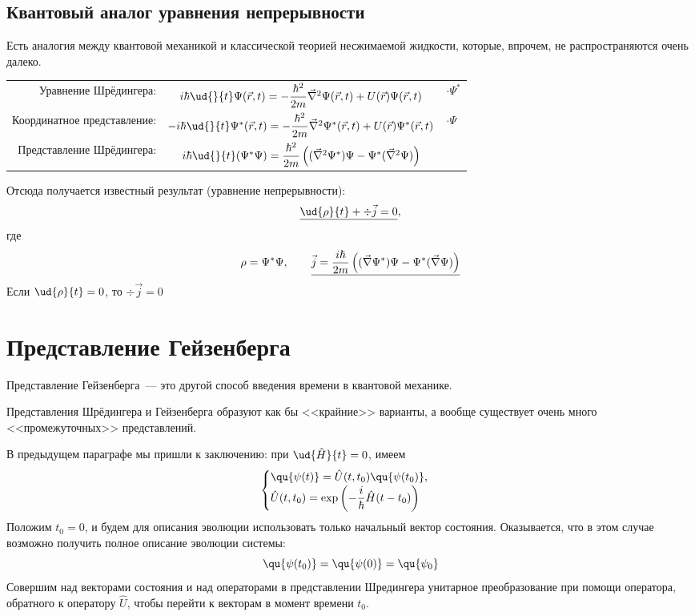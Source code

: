 \subsection{Квантовый аналог уравнения непрерывности}
\Rem Есть аналогия между квантовой механикой и классической теорией несжимаемой жидкости, которые, впрочем, не распространяются очень далеко.

\begin{tabular}{r|c|l}
  Уравнение Шрёдингера:  & $
    i \hbar \ud{}{t} \Psi (\vec r, t) = - \dfrac{\hbar^2}{2m} \vec \nabla^2 \Psi(\vec r, t) + U(\vec r) \Psi(\vec r, t)
$ & $\cdot \Psi^\ast$ \\[10pt]
  Координатное представление: &
  $
    -i \hbar \ud{}{t} \Psi^\ast (\vec r, t) = - \dfrac{\hbar^2}{2m} \vec \nabla^2 \Psi^\ast(\vec r, t) + U(\vec r) \Psi^\ast(\vec r, t)
$
   & $\cdot \Psi$ \\[10pt]
  Представление Шрёдингера: &
  $i\hbar \ud{}{t} (\Psi^\ast \Psi) = \dfrac{\hbar^2}{2m} \left(
        (\vec \nabla^2 \Psi^\ast)\Psi - \Psi^\ast(\vec \nabla^2 \Psi)
   \right)$
   &  \\
\end{tabular}

Отсюда получается известный результат (уравнение непрерывности):
$$
        \underline{\ud{\rho}{t} + \div \vec j = 0},
$$
где
$$
    \rho = \Psi^\ast \Psi, \qquad \underline{\vec j = \dfrac{i \hbar}{2m} \left(
        (\vec \nabla \Psi^\ast)\Psi - \Psi^\ast(\vec \nabla \Psi)
    \right)}\index{Уравнение непрерывности}
$$
Если $\ud{\rho}{t} = 0$, то $\div \vec j = 0$

\section{Представление Гейзенберга}
Представление Гейзенберга~--- это другой способ введения времени в квантовой механике.

\Rem Представления Шрёдингера и Гейзенберга образуют как бы <<крайние>> варианты, а вообще существует очень много <<промежуточных>> представлений.

В предыдущем параграфе мы пришли к заключению: при $\ud{\Hat H}{t} = 0$, имеем
$$
    \begin{cases}
    \qu{\psi(t)} = \hat U (t, t_0) \qu{\psi(t_0)},\\
    \Hat U(t, t_0)  = \exp \left( -\dfrac{i}{\hbar}\Hat H (t-t_0) \right)
    \end{cases}
$$
Положим $t_0 = 0$, и будем для описания эволюции использовать только начальный вектор состояния. Оказывается, что в этом случае возможно получить полное описание эволюции системы:
$$
    \qu{\psi(t_0)}=\qu{\psi(0)} = \qu{\psi_0}
$$
Совершим над векторами состояния и над операторами в представлении Шредингера унитарное преобразование при помощи оператора, обратного к оператору $\hat U$, чтобы перейти к векторам в момент времени $t_0$.

